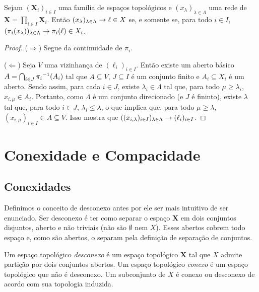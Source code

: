 \begin{prop}
Sejam $(\bm X_i)_{i \in I}$ uma família de espaços topológicos e $(x_\lambda)_{\lambda \in \Lambda}$ uma rede de $\bm X = \prod_{i \in I} \bm X_i$. Então $(x_\lambda)_{\lambda \in \Lambda} \rightarrow \ell \in X$ se, e somente se, para todo $i \in I$, $(\pi_i(x_\lambda))_{\lambda \in \Lambda} \rightarrow \pi_i(\ell) \in X_i$.
\end{prop}
\begin{proof} \hfill

($\Rightarrow$) Segue da continuidade de $\pi_i$.

($\Leftarrow$) Seja $V$ uma vizinhança de $(\ell_i)_{i \in I}$. Então existe um aberto básico $A = \bigcap_{i \in J} {\pi_i}^{-1}(A_i)$ tal que $A \subseteq V$, $J \subseteq I$ é um conjunto finito e $A_i \subseteq X_i$ é um aberto. Sendo assim, para cada $i \in J$, existe $\lambda_i \in \Lambda$ tal que, para todo $\mu \geq \lambda_i$, $x_{i,\mu} \in A_i$. Portanto, como $\Lambda$ é um conjunto direcionado (e $J$ é fininto), existe $\lambda$ tal que, para todo $i \in J$, $\lambda_i \leq \lambda$, o que implica que, para todo $\mu \geq \lambda$, $(x_{i,\mu})_{i \in I} \in A \subseteq V$. Isso mostra que $((x_{i,\lambda})_{i \in I})_{\lambda \in \Lambda} \rightarrow (\ell_i)_{i \in I}$.
\end{proof}




\section{Conexidade e Compacidade}

\subsection{Conexidades}

Definimos o conceito de desconexo antes por ele ser mais intuitivo de ser enunciado. Ser desconexo é ter como separar o espaço $\bm X$ em dois conjuntos disjuntos, aberto e não triviais (não são $\emptyset$ nem $X$). Esses abertos cobrem todo espaço e, como são abertos, o separam pela definição de separação de conjuntos.

\begin{defi}
Um espaço topológico \emph{desconexo} é um espaço topológico $\bm X$ tal que $X$ admite partição por dois conjuntos abertos. Um espaço topológico \emph{conexo} é um espaço topológico que não é desconexo. Um subconjunto de $X$ é conexo ou desconexo de acordo com sua topologia induzida.
\end{defi}

